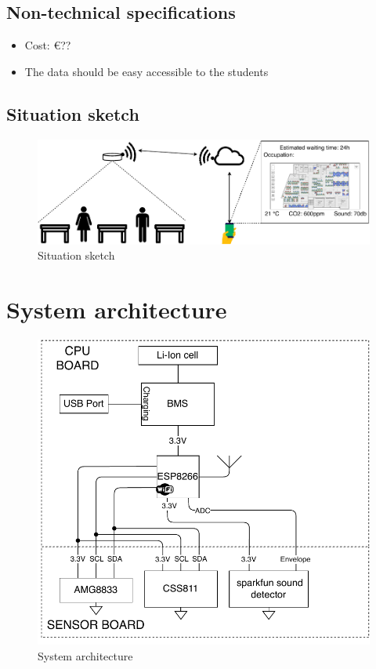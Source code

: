 \documentclass[]{article}
\begin{document}
	\subsection{Non-technical specifications}
	\begin{itemize}
		\item Cost: \euro{??}
		\item The data should be easy accessible to the students
		
	\end{itemize}
	\subsection{Situation sketch}
	\begin{figure}[!ht]
		\centering
		\includegraphics[width=1\linewidth]{situation.pdf}
		\caption{Situation sketch}
		\label{fig:situation}
	\end{figure} 
	\newpage
	\section{System architecture}
	\begin{figure}[!ht]
		\centering
		\includegraphics[width=1\linewidth]{architecture.pdf}
		\caption{System architecture}
		\label{fig:situation}
	\end{figure} 
\end{document}
